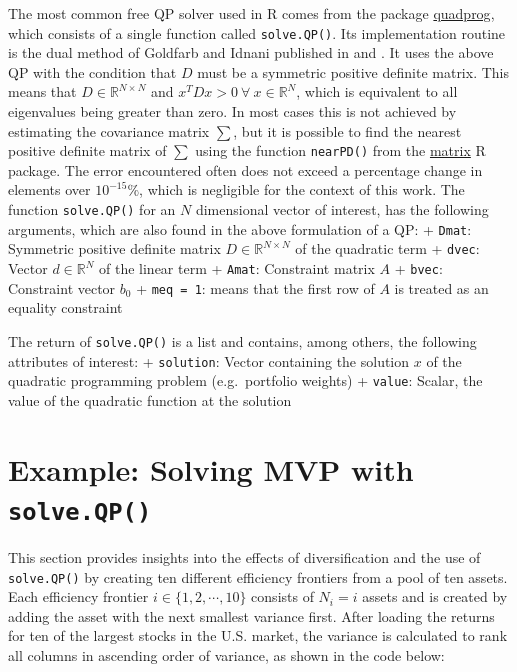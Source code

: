 \documentclass[
  oneside]{book}
\begin{document}
The most common free QP solver used in R comes from the package \href{https://cran.r-project.org/web/packages/quadprog/quadprog.pdf}{quadprog}, which consists of a single function called \texttt{solve.QP()}. Its implementation routine is the dual method of Goldfarb and Idnani published in \citep{GoId1982} and \citep{GoId1983}. It uses the above QP with the condition that \(D\) must be a symmetric positive definite matrix. This means that \(D\in \mathbb{R}^{N \times N}\) and \(x^T D x > 0 \ \forall \ x \in \mathbb{R}^N\), which is equivalent to all eigenvalues being greater than zero. In most cases this is not achieved by estimating the covariance matrix \(\sum\), but it is possible to find the nearest positive definite matrix of \(\textstyle\sum\) using the function \texttt{nearPD()} from the \href{https://cran.r-project.org/web/packages/Matrix/Matrix.pdf}{matrix} R package. The error encountered often does not exceed a percentage change in elements over \(10^{-15} \%\), which is negligible for the context of this work. The function \texttt{solve.QP()} for an \(N\) dimensional vector of interest, has the following arguments, which are also found in the above formulation of a QP:
+ \texttt{Dmat}: Symmetric positive definite matrix \(D \in \mathbb{R}^{N \times N}\) of the quadratic term
+ \texttt{dvec}: Vector \(d \in \mathbb{R}^{N}\) of the linear term
+ \texttt{Amat}: Constraint matrix \(A\)
+ \texttt{bvec}: Constraint vector \(b_0\)
+ \texttt{meq\ =\ 1}: means that the first row of \(A\) is treated as an equality constraint

The return of \texttt{solve.QP()} is a list and contains, among others, the following attributes of interest:
+ \texttt{solution}: Vector containing the solution \(x\) of the quadratic programming problem (e.g.~portfolio weights)
+ \texttt{value}: Scalar, the value of the quadratic function at the solution

\hypertarget{exampleanalyticalmvp}{%
\section{\texorpdfstring{Example: Solving MVP with \texttt{solve.QP()}}{Example: Solving MVP with solve.QP()}}\label{exampleanalyticalmvp}}

This section provides insights into the effects of diversification and the use of \texttt{solve.QP()} by creating ten different efficiency frontiers from a pool of ten assets. Each efficiency frontier \(i \in \{1, 2, \cdots, 10\}\) consists of \(N_i = i\) assets and is created by adding the asset with the next smallest variance first. After loading the returns for ten of the largest stocks in the U.S. market, the variance is calculated to rank all columns in ascending order of variance, as shown in the code below:
\end{document}
